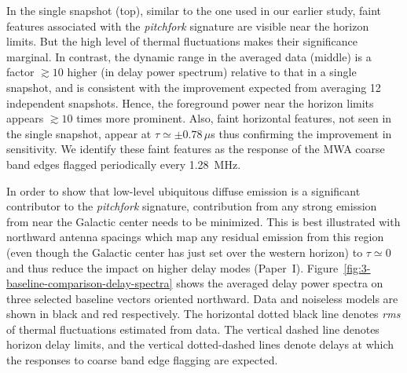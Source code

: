 \documentclass[preprint2,apjl,numberedappendix,twocolappendix,appendixfloats]{emulateapj}
\begin{document}
\begin{figure}[htb]
\end{figure}

In the single snapshot (top), similar to the one used in our earlier study, faint features associated with the {\it pitchfork} signature are visible near the horizon limits. But the high level of thermal fluctuations makes their significance marginal. In contrast, the dynamic range in the averaged data (middle) is a factor $\gtrsim 10$ higher (in delay power spectrum) relative to that in a single snapshot, and is consistent with the improvement expected from averaging 12 independent snapshots. Hence, the foreground power near the horizon limits appears $\gtrsim 10$ times more prominent. Also, faint horizontal features, not seen in the single snapshot, appear at $\tau \simeq \pm 0.78\,\mu$s thus confirming the improvement in sensitivity. We identify these faint features as the response of the MWA coarse band edges flagged periodically every 1.28~MHz. 

In order to show that low-level ubiquitous diffuse emission is a significant contributor to the {\it pitchfork} signature, contribution from any strong emission from near the Galactic center needs to be minimized. This is best illustrated with northward antenna spacings which map any residual emission from this region (even though the Galactic center has just set over the western horizon) to $\tau\simeq 0$ and thus reduce the impact on higher delay modes (Paper~I). Figure~\ref{fig:3-baseline-comparison-delay-spectra} shows the averaged delay power spectra on three selected baseline vectors oriented northward. Data and noiseless models are shown in black and red respectively. The horizontal dotted black line denotes {\it rms} of thermal fluctuations estimated from data. The vertical dashed line denotes horizon delay limits, and the vertical dotted-dashed lines denote delays at which the responses to coarse band edge flagging are expected.
\end{document}
